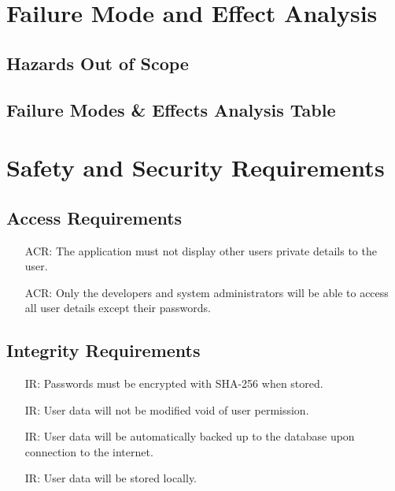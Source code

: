 \documentclass{article}
\newcounter{ACRnum}
\newcounter{IRnum}
\begin{document}
	
	\section{Failure Mode and Effect Analysis}
	\subsection{Hazards Out of Scope}
	\subsection{Failure Modes \& Effects Analysis Table}
	
	\section{Safety and Security Requirements}
	
	
	\subsection{Access Requirements}
	\noindent 
	\begin{itemize}
		\item[ACR\refstepcounter{ACRnum}\theACRnum:]
		The application must not display other users private details to the user.
		\item[ACR\refstepcounter{ACRnum}\theACRnum:]
		Only the developers and system administrators will be able to access all user details except their passwords.
	\end{itemize}
	\subsection{Integrity Requirements}
	\noindent 
	\begin{itemize}
		\item[IR\refstepcounter{IRnum}\theIRnum:]
		Passwords must be encrypted with SHA-256 when stored.
		\item[IR\refstepcounter{IRnum}\theIRnum:]
		User data will not be modified void of user permission.
		\item[IR\refstepcounter{IRnum}\theIRnum:]
		User data will be automatically backed up to the database upon connection to the internet.
		\item[IR\refstepcounter{IRnum}\theIRnum:]
		User data will be stored locally.
	\end{itemize}
\end{document}

